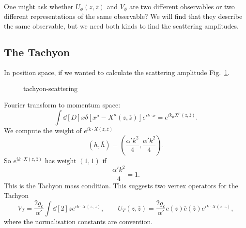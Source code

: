 One might ask whether $U_\phi(z, \overline{z}{})$ and $V_\phi$ are two different observables or two different representations of the same observable?
We will find that they describe the same observable, but we need both kinds to find the scattering amplitudes.

\subsection{The Tachyon}%
\label{sub:the_tachyon2}

In position space, if we wanted to calculate the scattering amplitude Fig.~\ref{fig:tachyon-scattering}.
\begin{figure}[ht]
    \centering
    \caption{tachyon-scattering}
    \label{fig:tachyon-scattering}
\end{figure}

Fourier transform to momentum space:
\begin{equation}
  \int \dd[D]{x} \delta[x^{\mu} - X^{\mu}(z, \overline{z}{})] e^{i k \cdot x} = e^{i k_{\mu} X^{\mu}(z, \overline{z}{})}.
\end{equation}
We compute the weight of $e^{i k \cdot X(z, \overline{z}{})}$
\begin{equation}
  (h, \overline{h}{}) = \left( \frac{\alpha' k^2}{4}, \frac{\alpha' k^2}{4} \right).
\end{equation}
So $e^{i k \cdot X(z, \overline{z}{})}$ has weight $(1, 1)$ if 
\begin{equation}
  \boxed{\frac{\alpha' k^2}{4} = 1}.
\end{equation}
This is the Tachyon mass condition.
This suggests two vertex operators for the Tachyon
\begin{equation}
  V_T = \frac{2 g_c}{\alpha'} \int \dd[2]{z} e^{i k \cdot X(z, \overline{z}{})}, \qquad U_T(z, \overline{z}{}) = \frac{2 g_c}{\alpha'} c(z) \overline{c}{}(\overline{z}{}) e^{i k \cdot X(z, \overline{z}{})},
\end{equation}
where the normalisation constants are convention.
